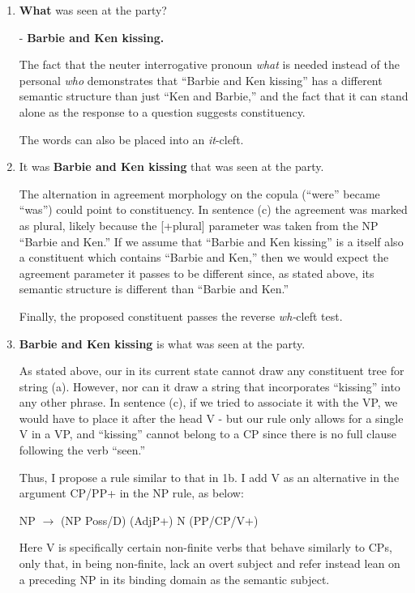 \documentclass[12pt]{article}
\begin{document}
\begin{enumerate}
\begin{enumerate}
\item \textbf{What} was seen at the party?

	- \textbf{Barbie and Ken kissing.}

The fact that the neuter interrogative pronoun \emph{what} is needed instead of the personal \emph{who} demonstrates that ``Barbie and Ken kissing'' has a different semantic structure than just ``Ken and Barbie,'' and the fact that it can stand alone as the response to a question suggests constituency.

The words can also be placed into an \emph{it}-cleft.

\item It was \textbf{Barbie and Ken kissing} that was seen at the party.

The alternation in agreement morphology on the copula (``were'' became ``was'') could point to constituency. In sentence (c) the agreement was marked as plural, likely because the [+plural] parameter was taken from the NP ``Barbie and Ken.'' If we assume that ``Barbie and Ken kissing'' is a itself also a constituent which contains ``Barbie and Ken,'' then we would expect the agreement parameter it passes to be different since, as stated above, its semantic structure is different than ``Barbie and Ken.''

Finally, the proposed constituent passes the reverse \emph{wh-}cleft test.

\item \textbf{Barbie and Ken kissing} is what was seen at the party.

As stated above, our in its current state cannot draw any constituent tree for string (a). However, nor can it draw a string that incorporates ``kissing'' into any other phrase. In sentence (c), if we tried to associate it with the VP, we would have to place it after the head V - but our rule only allows for a single V in a VP, and ``kissing'' cannot belong to a CP since there is no full clause following the verb ``seen.''

Thus, I propose a rule similar to that in 1b. I add V as an alternative in the argument {CP/PP}+ in the NP rule, as below:

NP $\rightarrow$ ({NP Poss/D}) (AdjP+) N ({PP/CP/V}+)

Here V is specifically certain non-finite verbs that behave similarly to CPs, only that, in being non-finite, lack an overt subject and refer instead lean on a preceding NP in its binding domain as the semantic subject.


\end{enumerate}
\end{enumerate}
\end{document}
